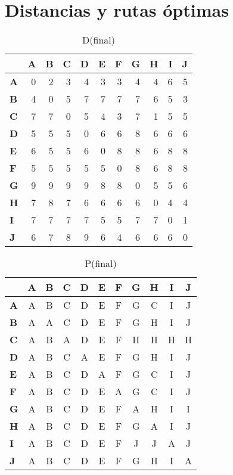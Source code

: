 \documentclass{article}
\begin{document}
\section*{Distancias y rutas óptimas}
\begin{table}[H]\centering
\caption{D(final)}
\begin{tabular}{l r r r r r r r r r r}
\toprule
 & \textbf{A} & \textbf{B} & \textbf{C} & \textbf{D} & \textbf{E} & \textbf{F} & \textbf{G} & \textbf{H} & \textbf{I} & \textbf{J}\\\midrule
\textbf{A} & 0 & 2 & 3 & 4 & 3 & 3 & 4 & 4 & 6 & 5 \\
\textbf{B} & 4 & 0 & 5 & 7 & 7 & 7 & 7 & 6 & 5 & 3 \\
\textbf{C} & 7 & 7 & 0 & 5 & 4 & 3 & 7 & 1 & 5 & 5 \\
\textbf{D} & 5 & 5 & 5 & 0 & 6 & 6 & 8 & 6 & 6 & 6 \\
\textbf{E} & 6 & 5 & 5 & 6 & 0 & 8 & 8 & 6 & 8 & 8 \\
\textbf{F} & 5 & 5 & 5 & 5 & 5 & 0 & 8 & 6 & 8 & 8 \\
\textbf{G} & 9 & 9 & 9 & 9 & 8 & 8 & 0 & 5 & 5 & 6 \\
\textbf{H} & 7 & 8 & 7 & 6 & 6 & 6 & 6 & 0 & 4 & 4 \\
\textbf{I} & 7 & 7 & 7 & 7 & 5 & 5 & 7 & 7 & 0 & 1 \\
\textbf{J} & 6 & 7 & 8 & 9 & 6 & 4 & 6 & 6 & 6 & 0 \\
\bottomrule
\end{tabular}
\end{table}

\begin{table}[H]\centering
\caption{P(final)}
\begin{tabular}{l c c c c c c c c c c}
\toprule
 & \textbf{A} & \textbf{B} & \textbf{C} & \textbf{D} & \textbf{E} & \textbf{F} & \textbf{G} & \textbf{H} & \textbf{I} & \textbf{J}\\\midrule
\textbf{A} & A & B & C & D & E & F & G & C & I & J \\
\textbf{B} & A & A & C & D & E & F & G & H & I & J \\
\textbf{C} & A & B & A & D & E & F & H & H & H & H \\
\textbf{D} & A & B & C & A & E & F & G & H & I & J \\
\textbf{E} & A & B & C & D & A & F & G & C & I & J \\
\textbf{F} & A & B & C & D & E & A & G & C & I & J \\
\textbf{G} & A & B & C & D & E & F & A & H & I & I \\
\textbf{H} & A & B & C & D & E & F & G & A & I & J \\
\textbf{I} & A & B & C & D & E & F & J & J & A & J \\
\textbf{J} & A & B & C & D & E & F & G & H & I & A \\
\bottomrule
\end{tabular}
\end{table}
\end{document}
